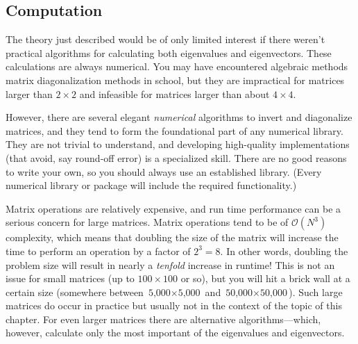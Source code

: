 % 


\subsection{Computation}

 
The theory just described would be of only limited interest if there
weren't practical algorithms for calculating both eigenvalues and
eigenvectors.  These calculations are always numerical.  You may have
encountered algebraic methods matrix diagonalization methods in
school, but they are impractical for matrices larger than $2 \times 2$
and infeasible for matrices larger than about $4 \times 4$.

However, there are several elegant \emph{numerical} algorithms to
invert and diagonalize matrices, and they tend to form the
foundational part of any numerical library. They are not trivial to
understand, and developing high-quality implementations (that avoid,
say round-off error) is a specialized skill. There are no good
reasons to write your own, so you should always use an established
library. (Every numerical library or package will include the required
functionality.)

Matrix operations are relatively
expensive, and run time performance can be a serious concern for large
matrices. Matrix operations tend to be of $\mathcal{O}(N^3)$ complexity,
which means that doubling the size\vadjust{\pagebreak} of the matrix will
increase the time to perform an operation by a factor of $2^3 = 8$. In
other words, doubling the problem size will result in nearly a
\emph{tenfold} increase in runtime! This is not an issue for small
matrices (up to $100 \times 100$ or so), but you will hit a brick wall
at a certain size (somewhere between $\text{5,000}
\times \text{5,000}$ and $\text{50,000} \times \text{50,000}$). Such
large matrices do occur in practice but usually not in the context of
the topic of this chapter.  For even larger matrices there are
alternative algorithms---\break which, however, calculate only the most
important of the eigenvalues and eigenvectors.

